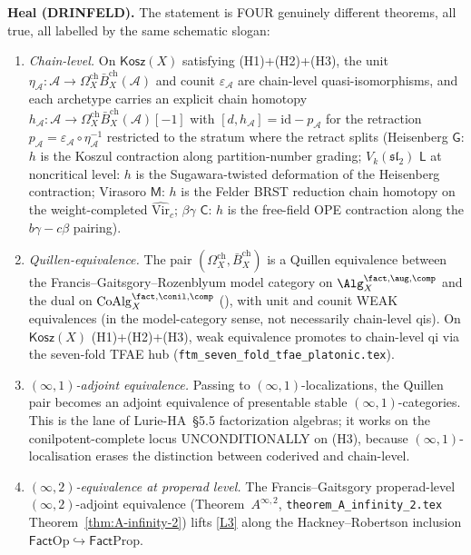 \documentclass[11pt]{article}
\theoremstyle{definition}
\newcommand{\Bbarch}{\bar B^{\mathrm{ch}}}
\newcommand{\Omegach}{\Omega^{\mathrm{ch}}}
\newcommand{\Kosz}{\mathsf{Kosz}}
\newcommand{\Fact}{\mathsf{Fact}}
\newcommand{\id}{\mathrm{id}}
\newcommand{\cA}{\mathcal{A}}
\begin{document}
\textbf{Heal (DRINFELD).} The statement is FOUR genuinely different
theorems, all true, all labelled by the same schematic slogan:
\begin{enumerate}[label=\textup{(L\arabic*)}]
\item \label{L1} \emph{Chain-level.} On $\Kosz(X)$ satisfying (H1)+(H2)+(H3),
the unit $\eta_\cA\colon\cA\to\Omegach_X\Bbarch_X(\cA)$ and counit
$\varepsilon_\cA$ are chain-level quasi-isomorphisms, and each
archetype carries an explicit chain homotopy
$h_\cA\colon\cA\to\Omegach_X\Bbarch_X(\cA)[-1]$ with
$[d,h_\cA]=\id-p_\cA$ for the retraction
$p_\cA=\varepsilon_\cA\circ\eta_\cA^{-1}$ restricted to the stratum
where the retract splits (Heisenberg $\mathsf{G}$: $h$ is the
Koszul contraction along partition-number grading;
$V_k(\mathfrak{sl}_2)$ $\mathsf{L}$ at noncritical level: $h$ is the
Sugawara-twisted deformation of the Heisenberg contraction; Virasoro
$\mathsf{M}$: $h$ is the Felder BRST reduction chain homotopy on the
weight-completed $\widehat{\mathrm{Vir}}_c$; $\beta\gamma$ $\mathsf{C}$:
$h$ is the free-field OPE contraction along the $b\gamma - c\beta$
pairing).
\item \label{L2} \emph{Quillen-equivalence.} The pair
$(\Omegach_X,\Bbarch_X)$ is a Quillen equivalence between the
Francis--Gaitsgory--Rozenblyum model category on
$\Alg^{\fact,\aug,\comp}_X$ and the dual on
$\mathrm{CoAlg}^{\fact,\conil,\comp}_X$ (\cite[Chapter IV.5]{GR17}),
with unit and counit WEAK equivalences (in the model-category
sense, not necessarily chain-level qis). On $\Kosz(X)$ (H1)+(H2)+(H3),
weak equivalence promotes to chain-level qi via the
seven-fold TFAE hub (\texttt{ftm\_seven\_fold\_tfae\_platonic.tex}).
\item \label{L3} \emph{$(\infty,1)$-adjoint equivalence.} Passing to
$(\infty,1)$-localizations, the Quillen pair becomes an adjoint
equivalence of presentable stable $(\infty,1)$-categories. This is
the lane of Lurie-HA~\S5.5 factorization algebras; it works on the
conilpotent-complete locus UNCONDITIONALLY on (H3), because
$(\infty,1)$-localisation erases the distinction between
coderived and chain-level.
\item \label{L4} \emph{$(\infty,2)$-equivalence at properad level.} The
Francis--Gaitsgory properad-level $(\infty,2)$-adjoint equivalence
(Theorem~$A^{\infty,2}$, \texttt{theorem\_A\_infinity\_2.tex}
Theorem~\ref{thm:A-infinity-2}) lifts \ref{L3} along the
Hackney--Robertson inclusion $\Fact\mathrm{Op}\hookrightarrow\Fact\mathrm{Prop}$.
\end{enumerate}
\end{document}
